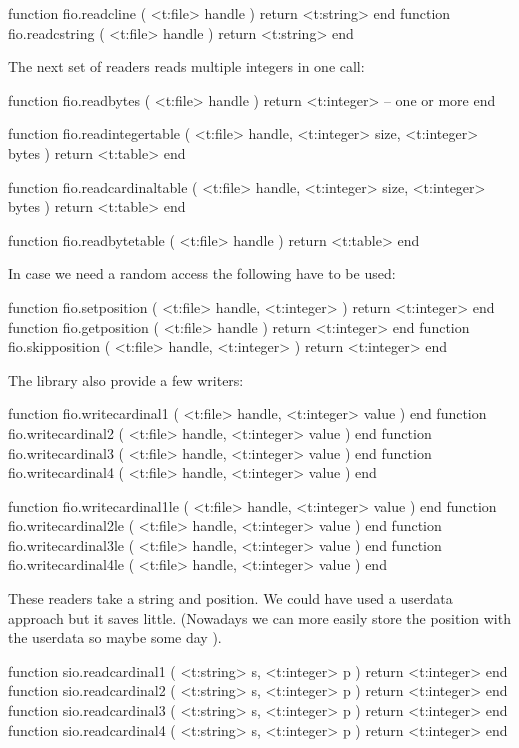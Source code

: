 \starttyping[option=LUA]
function fio.readcline   ( <t:file> handle ) return <t:string> end
function fio.readcstring ( <t:file> handle ) return <t:string> end
\stoptyping

The next set of readers reads multiple integers in one call:

\starttyping[option=LUA]
function fio.readbytes (
    <t:file> handle
)
    return <t:integer> -- one or more
end
\stoptyping

\starttyping[option=LUA]
function fio.readintegertable (
    <t:file>    handle,
    <t:integer> size,
    <t:integer> bytes
)
    return <t:table>
end

function fio.readcardinaltable (
    <t:file>    handle,
    <t:integer> size,
    <t:integer> bytes
)
    return <t:table>
end

function fio.readbytetable (
    <t:file> handle
)
    return <t:table>
end
\stoptyping

In case we need a random access the following have to be used:

\starttyping[option=LUA]
function fio.setposition  ( <t:file> handle, <t:integer> ) return <t:integer> end
function fio.getposition  ( <t:file> handle              ) return <t:integer> end
function fio.skipposition ( <t:file> handle, <t:integer> ) return <t:integer> end
\stoptyping

The library also provide a few writers:

\starttyping[option=LUA]
function fio.writecardinal1 ( <t:file> handle, <t:integer> value ) end
function fio.writecardinal2 ( <t:file> handle, <t:integer> value ) end
function fio.writecardinal3 ( <t:file> handle, <t:integer> value ) end
function fio.writecardinal4 ( <t:file> handle, <t:integer> value ) end

function fio.writecardinal1le ( <t:file> handle, <t:integer> value ) end
function fio.writecardinal2le ( <t:file> handle, <t:integer> value ) end
function fio.writecardinal3le ( <t:file> handle, <t:integer> value ) end
function fio.writecardinal4le ( <t:file> handle, <t:integer> value ) end
\stoptyping

\stopsubsection

\startsubsection[title=Reading from a string]

These readers take a string and position. We could have used a userdata approach
but it saves little. (Nowadays we can more easily store the position with the
userdata so maybe some day \unknown).

\starttyping[option=LUA]
function sio.readcardinal1 ( <t:string> s, <t:integer> p ) return <t:integer> end
function sio.readcardinal2 ( <t:string> s, <t:integer> p ) return <t:integer> end
function sio.readcardinal3 ( <t:string> s, <t:integer> p ) return <t:integer> end
function sio.readcardinal4 ( <t:string> s, <t:integer> p ) return <t:integer> end

